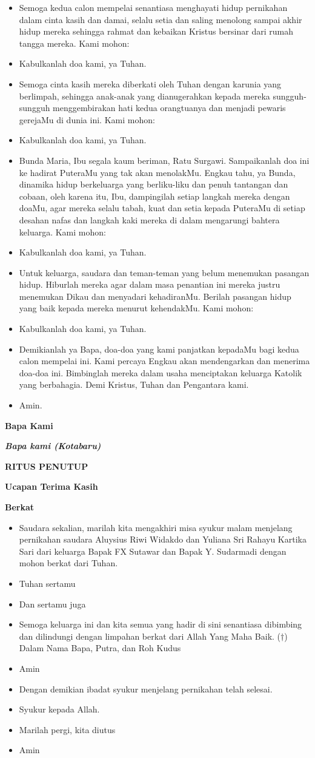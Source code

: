 \documentclass[a5paper,headsepline,titlepage,11pt,nnormalheadings]{scrartcl}
\makeatletter
\newcommand{\judul}[1]{%
  {\parindent \z@ \centering \normalfont
    \interlinepenalty\@M \Large \bfseries #1\par\nobreak \vskip 20\p@ }}
\newcommand{\subjudul}[1]{%
  {\parindent \z@ \normalfont
    \interlinepenalty\@M \bfseries #1\par\nobreak \vskip 20\p@ }}
\newcommand{\lagu}[1]{%
  {\parindent \z@ \normalfont
    \interlinepenalty\@M \bfseries \emph{#1}\par\nobreak \vskip 20\p@ }}
\newcommand{\BU}[1]{\begin{itemize} \item[U:] #1 \end{itemize}}
\newcommand{\BP}[1]{\begin{itemize} \item[P:] #1 \end{itemize}}
\newcommand{\keluargatri}{Y. Sudarmadi }
\newcommand{\keluargatra}{FX Sutawar }
\newcommand{\camantri}{Yuliana Sri Rahayu Kartika Sari }
\newcommand{\camantra}{Aluysius Riwi Widakdo }
\newcommand{\lagubapakami}{Bapa kami (Kotabaru) }
\makeatother
\begin{document}
\BP{Semoga kedua calon mempelai
senantiasa menghayati hidup pernikahan dalam cinta kasih dan damai, selalu
setia dan saling menolong sampai akhir hidup mereka sehingga rahmat dan
kebaikan Kristus bersinar dari rumah tangga mereka. Kami mohon:}

\BU{Kabulkanlah doa kami, ya Tuhan.}

\BP{Semoga cinta kasih mereka
diberkati oleh Tuhan dengan karunia yang berlimpah, sehingga anak-anak yang dianugerahkan
kepada mereka sungguh-sungguh menggembirakan hati kedua orangtuanya dan menjadi
pewaris gerejaMu di dunia ini. Kami mohon:}

\BU{Kabulkanlah doa kami, ya Tuhan.}

\BP{Bunda Maria, Ibu segala kaum beriman, Ratu Surgawi. Sampaikanlah doa ini ke hadirat PuteraMu yang tak akan menolakMu. Engkau tahu, ya Bunda, dinamika hidup berkeluarga yang berliku-liku dan penuh tantangan dan cobaan, oleh karena itu, Ibu, dampingilah setiap langkah mereka dengan doaMu, agar mereka selalu tabah, kuat dan setia kepada PuteraMu di setiap desahan nafas dan langkah kaki mereka di dalam mengarungi bahtera keluarga. Kami mohon:}

\BU{Kabulkanlah doa kami, ya Tuhan.}

\BP{Untuk keluarga, saudara dan teman-teman yang belum menemukan pasangan
hidup. Hiburlah mereka agar dalam masa penantian ini mereka justru menemukan
Dikau dan menyadari kehadiranMu. Berilah pasangan hidup yang baik kepada mereka
menurut kehendakMu. Kami mohon:}

\BU{Kabulkanlah doa kami, ya Tuhan.}

\BP{Demikianlah ya Bapa, doa-doa
yang kami panjatkan kepadaMu bagi kedua calon mempelai ini. Kami percaya Engkau akan
mendengarkan dan menerima doa-doa ini. Bimbinglah mereka dalam usaha
menciptakan keluarga Katolik yang berbahagia. Demi Kristus, Tuhan dan
Pengantara kami.}

\BU{Amin.}


\subjudul{Bapa Kami}
\lagu{\lagubapakami}

\judul{RITUS PENUTUP}

\subjudul{Ucapan Terima Kasih}

\subjudul{Berkat}

\BP{Saudara sekalian, marilah kita mengakhiri misa syukur malam menjelang pernikahan saudara \camantra dan \camantri dari keluarga Bapak \keluargatra dan Bapak \keluargatri  dengan mohon berkat dari Tuhan.}
\BP{Tuhan sertamu}
\BU{Dan sertamu juga}
\BP{Semoga keluarga ini dan kita semua yang hadir di sini senantiasa dibimbing dan dilindungi dengan limpahan berkat dari Allah Yang Maha Baik. ($\dagger$) Dalam Nama Bapa, Putra, dan Roh Kudus}
\BU{Amin}
\BP{Dengan demikian ibadat syukur menjelang pernikahan telah selesai.}
\BU{Syukur kepada Allah.}
\BP{Marilah pergi, kita diutus}
\BU{Amin}
\end{document}
